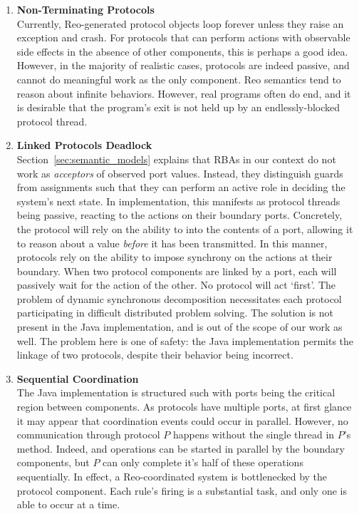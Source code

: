 \begin{enumerate}
	\item \textbf{Non-Terminating Protocols}\\
	Currently, Reo-generated protocol objects loop forever unless they raise an exception and crash. For protocols that can perform actions with observable side effects in the absence of other components, this is perhaps a good idea. However, in the majority of realistic cases, protocols are indeed passive, and cannot do meaningful work as the only component. Reo semantics tend to reason about infinite behaviors. However, real programs often do end, and it is desirable that the program's exit is not held up by an endlessly-blocked protocol thread.
	
	\item \textbf{Linked Protocols Deadlock}\\
	Section~\ref{sec:semantic_models} explains that RBAs in our context do not work as \textit{acceptors} of observed port values. Instead, they distinguish guards from assignments such that they can perform an active role in deciding the system's next state. In implementation, this manifests as protocol threads being passive, reacting to the actions on their boundary ports. Concretely, the protocol will rely on the ability to  into the contents of a port, allowing it to reason about a value \textit{before} it has been transmitted. In this manner, protocols rely on the ability to impose synchrony on the actions at their boundary. When two protocol components are linked by a port, each will passively wait for the action of the other. No protocol will act `first'. The problem of dynamic synchronous decomposition necessitates each protocol participating in difficult distributed problem solving. The solution is not present in the Java implementation, and is out of the scope of our work as well. The problem here is one of safety: the Java implementation permits the linkage of two protocols, despite their behavior being incorrect. 
	
	\item \textbf{Sequential Coordination}\\
	The Java implementation is structured such with ports being the critical region between components. As protocols have multiple ports, at first glance it may appear that coordination events could occur in parallel. However, no communication through protocol $P$ happens without the single thread in $P$'s  method. Indeed,  and  operations can be started in parallel by the boundary components, but $P$ can only complete it's half of these operations sequentially. In effect, a Reo-coordinated system is bottlenecked by the protocol component. Each rule's firing is a substantial task, and only one is able to occur at a time.
	
\end{enumerate}

